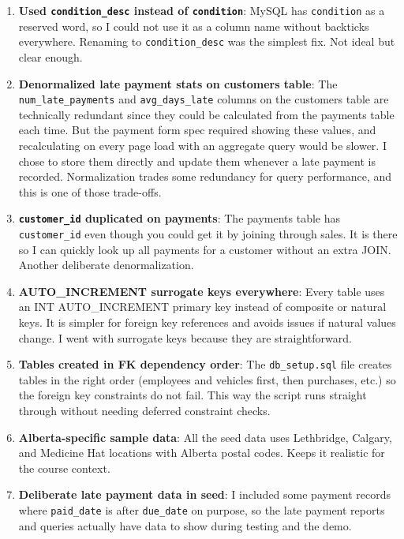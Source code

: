 \documentclass[12pt]{article}
\begin{document}
\begin{enumerate}
  \item \textbf{Used \texttt{condition\_desc} instead of \texttt{condition}}: MySQL has \texttt{condition} as a reserved word, so I could not use it as a column name without backticks everywhere. Renaming to \texttt{condition\_desc} was the simplest fix. Not ideal but clear enough.

  \item \textbf{Denormalized late payment stats on customers table}: The \texttt{num\_late\_payments} and \texttt{avg\_days\_late} columns on the customers table are technically redundant since they could be calculated from the payments table each time. But the payment form spec required showing these values, and recalculating on every page load with an aggregate query would be slower. I chose to store them directly and update them whenever a late payment is recorded. Normalization trades some redundancy for query performance, and this is one of those trade-offs.

  \item \textbf{\texttt{customer\_id} duplicated on payments}: The payments table has \texttt{customer\_id} even though you could get it by joining through sales. It is there so I can quickly look up all payments for a customer without an extra JOIN. Another deliberate denormalization.

  \item \textbf{AUTO\_INCREMENT surrogate keys everywhere}: Every table uses an INT AUTO\_INCREMENT primary key instead of composite or natural keys. It is simpler for foreign key references and avoids issues if natural values change. I went with surrogate keys because they are straightforward.

  \item \textbf{Tables created in FK dependency order}: The \texttt{db\_setup.sql} file creates tables in the right order (employees and vehicles first, then purchases, etc.) so the foreign key constraints do not fail. This way the script runs straight through without needing deferred constraint checks.

  \item \textbf{Alberta-specific sample data}: All the seed data uses Lethbridge, Calgary, and Medicine Hat locations with Alberta postal codes. Keeps it realistic for the course context.

  \item \textbf{Deliberate late payment data in seed}: I included some payment records where \texttt{paid\_date} is after \texttt{due\_date} on purpose, so the late payment reports and queries actually have data to show during testing and the demo.
\end{enumerate}
\end{document}
